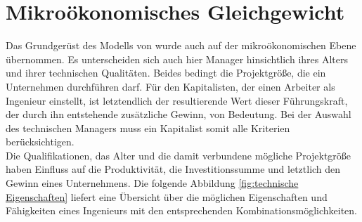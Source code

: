 \section[Mikroökonomisches Gleichgewicht]{Mikroökonomisches Gleichgewicht}\label{sec:mikro GG}
Das Grundgerüst des Modells von \citet{Acemoglu.2006} wurde auch auf der mikroökonomischen Ebene übernommen. Es unterscheiden sich auch hier Manager hinsichtlich ihres Alters und ihrer technischen Qualitäten. Beides bedingt die Projektgrö{\ss}e, die ein Unternehmen durchführen darf. Für den Kapitalisten, der einen Arbeiter als Ingenieur  einstellt, ist letztendlich der resultierende Wert dieser Führungskraft, der durch ihn entstehende zusätzliche Gewinn, von Bedeutung. Bei der Auswahl des technischen Managers muss ein Kapitalist somit alle Kriterien berücksichtigen.\\
Die Qualifikationen, das Alter und die damit verbundene mögliche Projektgrö{\ss}e haben Einfluss auf die Produktivität, die Investitionssumme und letztlich den Gewinn eines Unternehmens. Die folgende Abbildung \ref{fig:technische Eigenschaften} liefert eine Übersicht über die möglichen Eigenschaften und Fähigkeiten eines Ingenieurs mit den entsprechenden Kombinationsmöglichkeiten.\\


